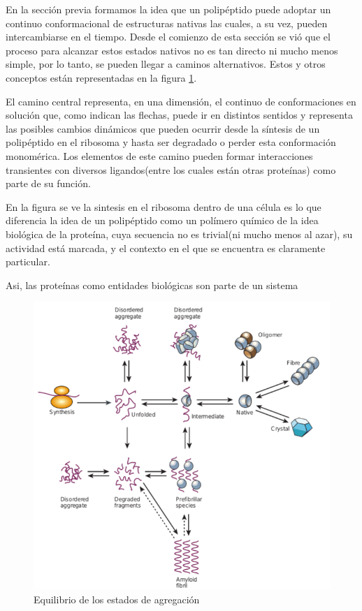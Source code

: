 En la sección previa formamos la idea que un polipéptido puede adoptar un continuo conformacional de estructuras nativas las cuales, a su vez, pueden intercambiarse en el tiempo.
Desde el comienzo de esta sección se vió que el proceso para alcanzar estos estados nativos no es tan directo ni mucho menos simple, por lo tanto, se pueden llegar a caminos alternativos. 
Estos y otros conceptos están representadas en la figura \ref{aggregationDiagram}.

El camino central representa, en una dimensión, el continuo de conformaciones en solución que, como indican las flechas, puede ir en distintos sentidos y representa las posibles cambios dinámicos que pueden ocurrir desde la síntesis
de un polipéptido en el ribosoma y hasta ser degradado o perder esta conformación monomérica.
Los elementos de este camino pueden formar interacciones transientes con diversos ligandos(entre los cuales están otras proteínas) como parte de su función. 

En la figura se ve 
la sintesis en el ribosoma dentro de una célula es lo que diferencia la idea de un polipéptido como un polímero químico de la idea biológica de la proteína, cuya secuencia no es trivial(ni mucho menos al azar), su actividad está marcada,
y el contexto en el que se encuentra es claramente particular.

Asi, las proteínas como entidades biológicas son parte de un sistema 

\begin{figure}[h!,centered]
\includegraphics[width=\textwidth]{img/aggregationDiagram.png} 
\caption{Equilibrio de los estados de agregación} \label{aggregationDiagram}
\end{figure}

